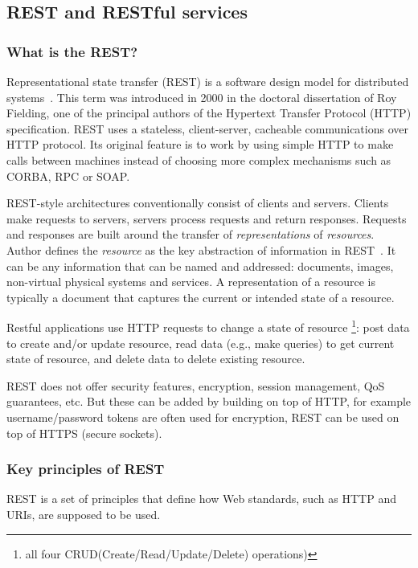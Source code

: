 \subsection{REST and RESTful services}

\subsubsection{What is the REST?}
Representational state transfer (REST) is a software design model for
distributed systems~\cite{Fielding2000}. This term was introduced in 2000 in the doctoral dissertation of
Roy Fielding, one of the principal authors of the Hypertext Transfer Protocol
(\gls{HTTP}) specification.
REST uses a stateless, client-server, cacheable communications over HTTP protocol. Its original
feature is to work by using simple HTTP to make calls between machines instead
of choosing more complex mechanisms such as CORBA, RPC or SOAP.

REST-style architectures conventionally consist of clients and servers.
Clients make requests to servers, servers process requests and return responses.
Requests and responses are built around the transfer of \textit{representations}
of \textit{resources}.
Author defines the \textit{resource} as the key abstraction of information in
REST~\cite{Fielding2000}. It can be any information that can be named and
addressed: documents, images, non-virtual physical systems and services.
A representation of a resource is typically a document that captures the current or intended state of a resource.

Restful applications use HTTP requests to change a state of resource  \footnote{
all four CRUD(Create/Read/Update/Delete) operations)}: post data to create and/or update
resource, read data (e.g., make queries) to get current state of resource, and
delete data to delete existing resource.

REST does not offer security features, encryption, session management, QoS
guarantees, etc. But these can be added by building on top of HTTP, for example
username/password tokens are often used for encryption, REST can be used on
top of HTTPS (secure sockets)\cite{ws_technologies_state_of_the_art}.

\subsubsection{Key principles of REST}
REST is a set of principles that define how Web standards, such as HTTP and
\gls{URI}s, are supposed to be used.

